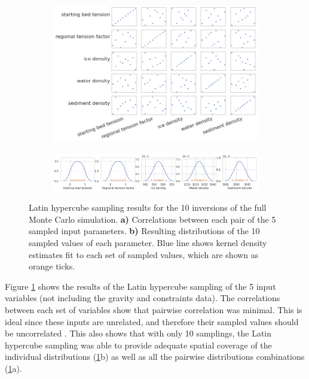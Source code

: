 \begin{figure}[!ht]
  \centering
    \begin{subfigure}[t]{.98\textwidth}
        \hspace*{-1.5cm} %
        \includegraphics[width=\textwidth]{figures/chp4/RIS_LHC_covariance.png}
        \caption{}
    \end{subfigure}
    \begin{subfigure}[t]{.9\textwidth}
        \centering
        \includegraphics[width=\textwidth]{figures/chp4/RIS_LHC_distributions.png}
        \caption{}
    \end{subfigure}
  \caption[Latin hypercube sampling distributions and correlations]{Latin hypercube sampling results for the 10 inversions of the full Monte Carlo simulation. \textbf{a)} Correlations between each pair of the 5 sampled input parameters. \textbf{b)} Resulting distributions of the 10 sampled values of each parameter. Blue line shows kernel density estimates fit to each set of sampled values, which are shown as orange ticks.}
    \label{fig:chp4_RIS_sampling_results}
\end{figure}

Figure \ref{fig:chp4_RIS_sampling_results} shows the results of the Latin hypercube sampling of the 5 input variables (not including the gravity and constraints data). The correlations between each set of variables show that pairwise correlation was minimal. This is ideal since these inputs are unrelated, and therefore their sampled values should be uncorrelated \citep{heltonsurvey2006}. This also shows that with only 10 samplings, the Latin hypercube sampling was able to provide adequate spatial coverage of the individual distributions (\ref{fig:chp4_RIS_sampling_results}b) as well as all the pairwise distributions combinations (\ref{fig:chp4_RIS_sampling_results}a).

